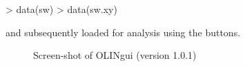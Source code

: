 \documentclass[a4paper,11pt]{article}
\begin{document}
\begin{Schunk}
\begin{Sinput}
> data(sw)
> data(sw.xy)
\end{Sinput}
\end{Schunk}
and subsequently loaded for analysis using the  buttons.

   
\begin{figure}
\centering
\centering
{}
\caption{Screen-shot of OLINgui (version 1.0.1)}
\label{fgbg}
\end{figure}
\end{document}

